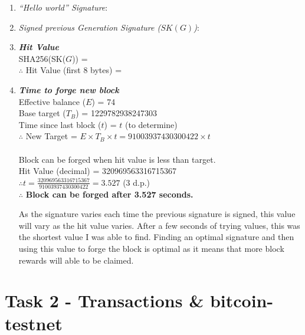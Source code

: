 \documentclass[11pt]{article}
\begin{document}
\begin{enumerate}
\item \textit{``Hello world'' Signature}: \texttt{}

\item \textit{Signed previous Generation Signature ($SK(G)$)}: \texttt{}

\item \textbf{\textit{Hit Value}}\\
SHA256(SK($G$)) = \texttt{}\\
$\therefore$ Hit Value (first 8 bytes) = \textbf{\texttt{}}

\item \textbf{\textit{Time to forge new block}}\\
Effective balance ($E$) = 74\\
Base target ($T_B$) = 1229782938247303\\
Time since last block ($t$) = $t$ (to determine)\\
$\therefore$ New Target = $E\times T_B\times t=91003937430300422\times{t}$\\
\\
Block can be forged when hit value is less than target.\\
Hit Value (decimal) = 320969563316715367\\
$\therefore t=\frac{320969563316715367}{91003937430300422}=3.527$ (3 d.p.)\\
$\therefore$ \textbf{Block can be forged after 3.527 seconds.}\\
\begin{small}
As the signature varies each time the previous signature is signed, this value will vary as the hit value varies. After a few seconds of trying values, this was the shortest value I was able to find. Finding an optimal signature and then using this value to forge the block is optimal as it means that more block rewards will able to be claimed.
\end{small}


\end{enumerate}

\section*{Task 2 - Transactions \& bitcoin-testnet}
\end{document}
